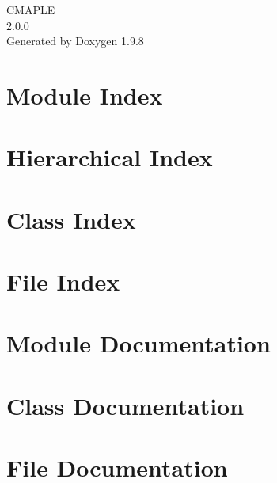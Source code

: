 \documentclass[twoside]{book}
\newcommand{\+}{\discretionary{\mbox{\scriptsize$\hookleftarrow$}}{}{}}
\newcommand{\clearemptydoublepage}{%
    \newpage{\pagestyle{empty}\cleardoublepage}%
  }
\begin{document}
  \raggedbottom
    \hypersetup{pageanchor=false,
                bookmarksnumbered=true,
                pdfencoding=unicode
               }
  \begin{titlepage}
  \vspace*{7cm}
  \begin{center}%
  {\Large CMAPLE}\\
  [1ex]\large 2.\+0.\+0 \\
  \vspace*{1cm}
  {\large Generated by Doxygen 1.9.8}\\
  \end{center}
  \end{titlepage}
  \clearemptydoublepage
  \tableofcontents
  \clearemptydoublepage
  \hypersetup{pageanchor=true}

\chapter{Module Index}

\chapter{Hierarchical Index}

\chapter{Class Index}

\chapter{File Index}

\chapter{Module Documentation}

\chapter{Class Documentation}







\chapter{File Documentation}







  \backmatter
  \newpage
  \clearemptydoublepage
  \printindex
\end{document}
